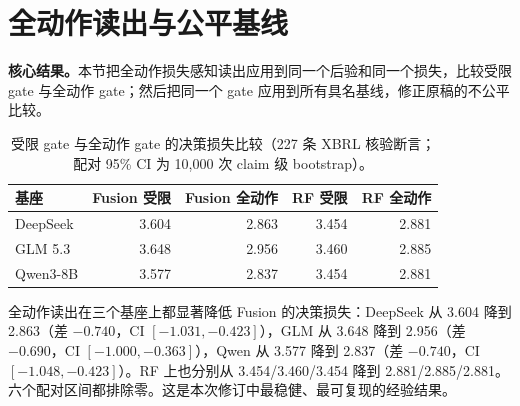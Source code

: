 \section{全动作读出与公平基线}

\begin{revbox}
\noindent\textbf{核心结果。}本节把全动作损失感知读出应用到同一个后验和同一个损失，比较受限 gate 与全动作 gate；然后把同一个 gate 应用到所有具名基线，修正原稿的不公平比较。
\end{revbox}

\begin{table}[H]
\centering
{}
\setlength{\tabcolsep}{3pt}
\caption{受限 gate 与全动作 gate 的决策损失比较（227 条 XBRL 核验断言；配对 95\% CI 为 10,000 次 claim 级 bootstrap）。}
\label{tab:fullaction}
\begin{tabular}{lrrrr}
\toprule
基座 & Fusion 受限 & Fusion 全动作 & RF 受限 & RF 全动作 \\
\midrule
DeepSeek & 3.604 & \cellcolor{yellow!25}2.863 & 3.454 & \cellcolor{yellow!25}2.881 \\
GLM 5.3 & 3.648 & \cellcolor{yellow!25}2.956 & 3.460 & \cellcolor{yellow!25}2.885 \\
Qwen3-8B & 3.577 & \cellcolor{yellow!25}2.837 & 3.454 & \cellcolor{yellow!25}2.881 \\
\bottomrule
\end{tabular}
\end{table}

\begin{revbox}
\noindent 全动作读出在三个基座上都显著降低 Fusion 的决策损失：DeepSeek 从 3.604 降到 2.863（差 $-0.740$，CI $[-1.031,-0.423]$），GLM 从 3.648 降到 2.956（差 $-0.690$，CI $[-1.000,-0.363]$），Qwen 从 3.577 降到 2.837（差 $-0.740$，CI $[-1.048,-0.423]$）。RF 上也分别从 3.454/3.460/3.454 降到 2.881/2.885/2.881。六个配对区间都排除零。这是本次修订中最稳健、最可复现的经验结果。
\end{revbox}

